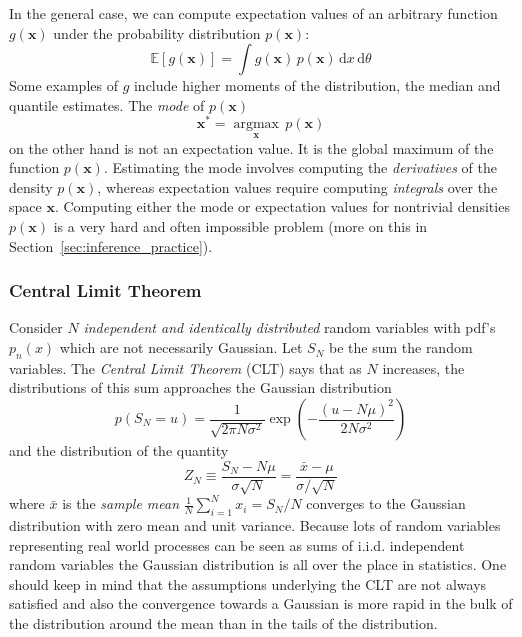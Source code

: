 \documentclass[12pt,dvipsnames]{report}
\newcommand{\ud}{\,\mathrm{d}}
\renewcommand{\vec}[1]{\boldsymbol{\mathbf{#1}}}
\begin{document}
In the general case, we can compute expectation values of an arbitrary function
$g(\vec{x})$ under the probability distribution $p(\vec{x})$:
\begin{equation}
    \mathbb{E}\left[g(\vec{x})\right]=\int g(\vec{x})\,p(\vec{x})\ud x
    \ud\theta
\end{equation}
Some examples of $g$ include higher moments of the distribution, the median and
quantile estimates. The \emph{mode} of $p(\vec{x})$
\begin{equation}
    \vec{x}^{*}=\underset{\vec{x}}{\operatorname{argmax}}\,p(\vec{x})
\end{equation}
on the other hand is not an expectation value. It is the global maximum of the
function $p(\vec{x})$.
Estimating the mode involves computing the \emph{derivatives} of the density
$p(\vec{x})$, whereas expectation values require computing
\emph{integrals} over the space $\vec{x}$. Computing either
the mode or expectation values
for nontrivial densities $p(\vec{x})$ is a very hard and often impossible problem
(more on this in Section~\ref{sec:inference_practice}).

\subsubsection{Central Limit Theorem}
Consider $N$ \emph{independent and identically distributed} random variables
with pdf's $p_n(x)$ which are not necessarily Gaussian. Let $S_N$ be the sum
the random variables. The \emph{Central Limit Theorem} (CLT) says that as $N$
increases, the distributions of this sum approaches the Gaussian distribution
\begin{equation}
    p\left(S_{N}=u\right)=\frac{1}{\sqrt{2 \pi N \sigma^{2}}} \exp \left(-\frac{(u-N \mu)^{2}}{2 N \sigma^{2}}\right)
\end{equation}
and the distribution of the quantity
\begin{equation}
    Z_{N} \equiv \frac{S_{N}-N \mu}{\sigma \sqrt{N}}=\frac{\bar{x}-\mu}{\sigma / \sqrt{N}}
\end{equation}
where $\bar{x}$ is the \emph{sample mean} $\frac{1}{N}\sum_{i=1}^Nx_i=S_N/N$
converges to the Gaussian distribution with zero mean and unit variance.
Because lots of random variables representing real world processes can be seen as sums
of i.i.d. independent random variables the Gaussian distribution is all over the place
in statistics. One should keep in mind that the assumptions underlying the CLT are
not always satisfied and also the convergence towards a Gaussian is
more rapid in the bulk of the distribution around the mean than in the tails of the
distribution.
\end{document}
